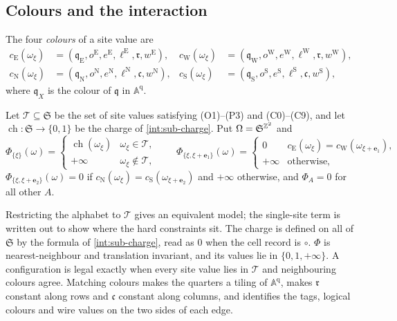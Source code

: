 \subsection{Colours and the interaction}

The four \emph{colours} of a site value are
\[
\begin{aligned}
c_{\mathrm E}(\omega_\xi)&=(\mathfrak q_{\mathrm E},o^{\mathrm E},e^{\mathrm E},\ell^{\mathrm E},\mathfrak r,w^{\mathrm E}), &
c_{\mathrm W}(\omega_\xi)&=(\mathfrak q_{\mathrm W},o^{\mathrm W},e^{\mathrm W},\ell^{\mathrm W},\mathfrak r,w^{\mathrm W}),\\
c_{\mathrm N}(\omega_\xi)&=(\mathfrak q_{\mathrm N},o^{\mathrm N},e^{\mathrm N},\ell^{\mathrm N},\mathfrak c,w^{\mathrm N}), &
c_{\mathrm S}(\omega_\xi)&=(\mathfrak q_{\mathrm S},o^{\mathrm S},e^{\mathrm S},\ell^{\mathrm S},\mathfrak c,w^{\mathrm S}),
\end{aligned}
\]
where $\mathfrak q_X$ is the colour of $\mathfrak q$ in $\mathbb A^{\mathrm q}$.

\begin{definition}\label{int:def-phi}
Let $\mathcal T\subseteq\mathfrak S$ be the set of site values satisfying (O1)--(P3) and (C0)--(C9), and let $\operatorname{ch}\colon\mathfrak S\to\{0,1\}$ be the charge of \cref{int:sub-charge}. Put $\Omega=\mathfrak S^{\mathbb{Z}^2}$ and
\[
\Phi_{\{\xi\}}(\omega)=\begin{cases}\operatorname{ch}(\omega_\xi)&\omega_\xi\in\mathcal T,\\+\infty&\omega_\xi\notin\mathcal T,\end{cases}\qquad
\Phi_{\{\xi,\xi+\mathbf e_1\}}(\omega)=\begin{cases}0&c_{\mathrm E}(\omega_\xi)=c_{\mathrm W}(\omega_{\xi+\mathbf e_1}),\\+\infty&\text{otherwise,}\end{cases}
\]
$\Phi_{\{\xi,\xi+\mathbf e_2\}}(\omega)=0$ if $c_{\mathrm N}(\omega_\xi)=c_{\mathrm S}(\omega_{\xi+\mathbf e_2})$ and $+\infty$ otherwise, and $\Phi_A=0$ for all other $A$.
\end{definition}

Restricting the alphabet to $\mathcal T$ gives an equivalent model; the single-site term is written out to show where the hard constraints sit. The charge is defined on all of $\mathfrak S$ by the formula of \cref{int:sub-charge}, read as $0$ when the cell record is $\circ$. $\Phi$ is nearest-neighbour and translation invariant, and its values lie in $\{0,1,+\infty\}$. A configuration is legal exactly when every site value lies in $\mathcal T$ and neighbouring colours agree. Matching colours makes the quarters a tiling of $\mathbb A^{\mathrm q}$, makes $\mathfrak r$ constant along rows and $\mathfrak c$ constant along columns, and identifies the tags, logical colours and wire values on the two sides of each edge.

